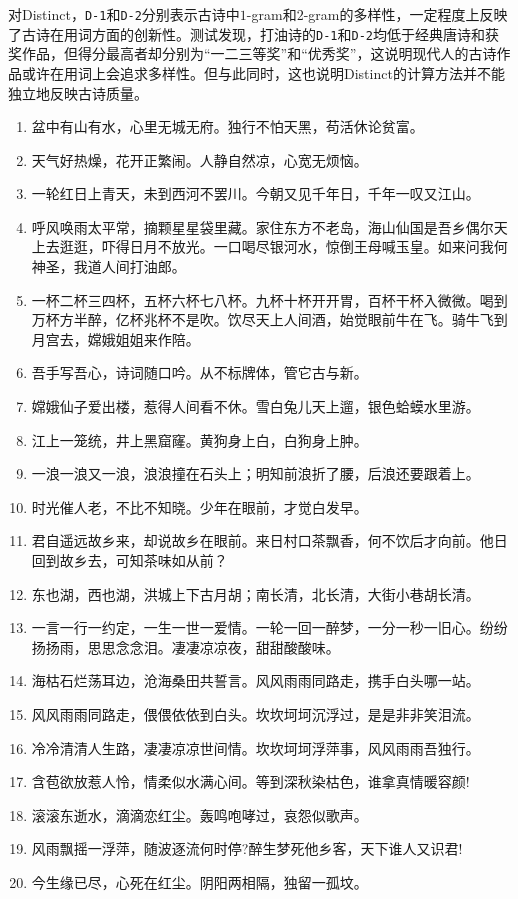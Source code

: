 对Distinct，\verb|D-1|和\verb|D-2|分别表示古诗中$1$-gram和$2$-gram的多样性，一定程度上反映了古诗在用词方面的创新性。测试发现，打油诗的\verb|D-1|和\verb|D-2|均低于经典唐诗和获奖作品，但得分最高者却分别为“一二三等奖”和“优秀奖”，这说明现代人的古诗作品或许在用词上会追求多样性。但与此同时，这也说明Distinct的计算方法并不能独立地反映古诗质量。

\begin{tcolorbox}[
  colback=white, %
  colframe=black, 
  boxrule=1pt,        %
  arc=0mm             %
  ]
  \kaishu 
  \begin{enumerate}
      \item 盆中有山有水，心里无城无府。独行不怕天黑，苟活休论贫富。
      \item 天气好热燥，花开正繁闹。人静自然凉，心宽无烦恼。
      \item 一轮红日上青天，未到西河不罢川。今朝又见千年日，千年一叹又江山。
      \item 呼风唤雨太平常，摘颗星星袋里藏。家住东方不老岛，海山仙国是吾乡偶尔天上去逛逛，吓得日月不放光。一口喝尽银河水，惊倒王母喊玉皇。如来问我何神圣，我道人间打油郎。
      \item 一杯二杯三四杯，五杯六杯七八杯。九杯十杯开开胃，百杯干杯入微微。喝到万杯方半醉，亿杯兆杯不是吹。饮尽天上人间酒，始觉眼前牛在飞。骑牛飞到月宫去，嫦娥姐姐来作陪。
      \item 吾手写吾心，诗词随口吟。从不标牌体，管它古与新。
      \item 嫦娥仙子爱出楼，惹得人间看不休。雪白兔儿天上遛，银色蛤蟆水里游。
      \item 江上一笼统，井上黑窟窿。黄狗身上白，白狗身上肿。
      \item 一浪一浪又一浪，浪浪撞在石头上；明知前浪折了腰，后浪还要跟着上。
      \item 时光催人老，不比不知晓。少年在眼前，才觉白发早。
      \item 君自遥远故乡来，却说故乡在眼前。来日村口茶飘香，何不饮后才向前。他日回到故乡去，可知茶味如从前？
      \item 东也湖，西也湖，洪城上下古月胡；南长清，北长清，大街小巷胡长清。
      \item 一言一行一约定，一生一世一爱情。一轮一回一醉梦，一分一秒一旧心。纷纷扬扬雨，思思念念泪。凄凄凉凉夜，甜甜酸酸味。
      \item 海枯石烂荡耳边，沧海桑田共誓言。风风雨雨同路走，携手白头哪一站。
      \item 风风雨雨同路走，偎偎依依到白头。坎坎坷坷沉浮过，是是非非笑泪流。
      \item 冷冷清清人生路，凄凄凉凉世间情。坎坎坷坷浮萍事，风风雨雨吾独行。
      \item 含苞欲放惹人怜，情柔似水满心间。等到深秋染枯色，谁拿真情暖容颜!
      \item 滚滚东逝水，滴滴恋红尘。轰鸣咆哮过，哀怨似歌声。
      \item 风雨飘摇一浮萍，随波逐流何时停?醉生梦死他乡客，天下谁人又识君!
      \item 今生缘已尽，心死在红尘。阴阳两相隔，独留一孤坟。
  \end{enumerate}
  
\end{tcolorbox}
